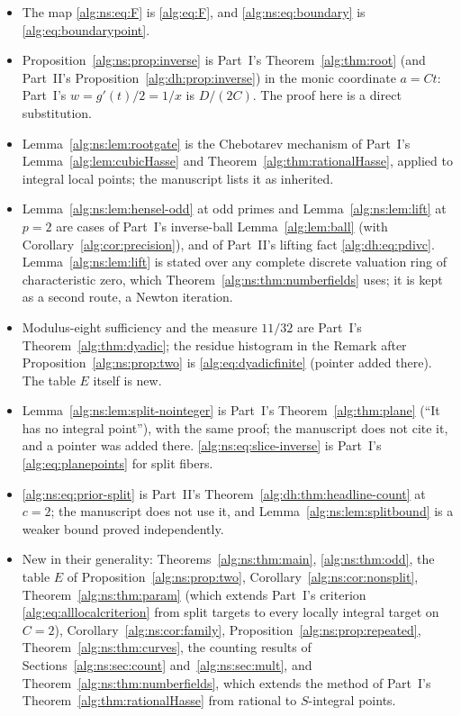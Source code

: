 \documentclass[11pt]{article}
\numberwithin{equation}{section}
\theoremstyle{plain}
\theoremstyle{plain}
\theoremstyle{plain}
\theoremstyle{definition}
\theoremstyle{definition}
\theoremstyle{definition}
\theoremstyle{remark}
\begin{document}
\begin{itemize}[itemsep=2pt,topsep=3pt]
\item The map \eqref{alg:ns:eq:F} is \eqref{alg:eq:F}, and
\eqref{alg:ns:eq:boundary} is \eqref{alg:eq:boundarypoint}.
\item Proposition~\ref{alg:ns:prop:inverse} is Part~I's
Theorem~\ref{alg:thm:root} (and Part~II's
Proposition~\ref{alg:dh:prop:inverse}) in the monic coordinate $a=Ct$:
Part~I's $w=g'(t)/2=1/x$ is $D/(2C)$. The proof here is a direct
substitution.
\item Lemma~\ref{alg:ns:lem:rootgate} is the Chebotarev mechanism of
Part~I's Lemma~\ref{alg:lem:cubicHasse} and
Theorem~\ref{alg:thm:rationalHasse}, applied to integral local points; the
manuscript lists it as inherited.
\item Lemma~\ref{alg:ns:lem:hensel-odd} at odd primes and
Lemma~\ref{alg:ns:lem:lift} at $p=2$ are cases of Part~I's inverse-ball
Lemma~\ref{alg:lem:ball} (with Corollary~\ref{alg:cor:precision}), and
of Part~II's lifting fact \eqref{alg:dh:eq:pdivc}.
Lemma~\ref{alg:ns:lem:lift} is stated over any complete discrete
valuation ring of characteristic zero, which
Theorem~\ref{alg:ns:thm:numberfields} uses; it is kept as a second
route, a Newton iteration.
\item Modulus-eight sufficiency and the measure $11/32$ are Part~I's
Theorem~\ref{alg:thm:dyadic}; the residue histogram in the Remark after
Proposition~\ref{alg:ns:prop:two} is \eqref{alg:eq:dyadicfinite}
(pointer added there). The table $E$ itself is new.
\item Lemma~\ref{alg:ns:lem:split-nointeger} is Part~I's
Theorem~\ref{alg:thm:plane} (``It has no integral point''), with the
same proof; the manuscript does not cite it, and a pointer was added
there. \eqref{alg:ns:eq:slice-inverse} is Part~I's
\eqref{alg:eq:planepoints} for split fibers.
\item \eqref{alg:ns:eq:prior-split} is Part~II's
Theorem~\ref{alg:dh:thm:headline-count} at $c=2$; the manuscript does not
use it, and Lemma~\ref{alg:ns:lem:splitbound} is a weaker bound proved
independently.
\item New in their generality: Theorems~\ref{alg:ns:thm:main},
\ref{alg:ns:thm:odd}, the table $E$ of
Proposition~\ref{alg:ns:prop:two}, Corollary~\ref{alg:ns:cor:nonsplit},
Theorem~\ref{alg:ns:thm:param} (which extends Part~I's criterion
\eqref{alg:eq:alllocalcriterion} from split targets to every locally
integral target on $C=2$), Corollary~\ref{alg:ns:cor:family},
Proposition~\ref{alg:ns:prop:repeated}, Theorem~\ref{alg:ns:thm:curves},
the counting results of Sections~\ref{alg:ns:sec:count}
and~\ref{alg:ns:sec:mult}, and Theorem~\ref{alg:ns:thm:numberfields},
which extends the method of Part~I's
Theorem~\ref{alg:thm:rationalHasse} from rational to $S$-integral points.
\end{itemize}
\end{document}
